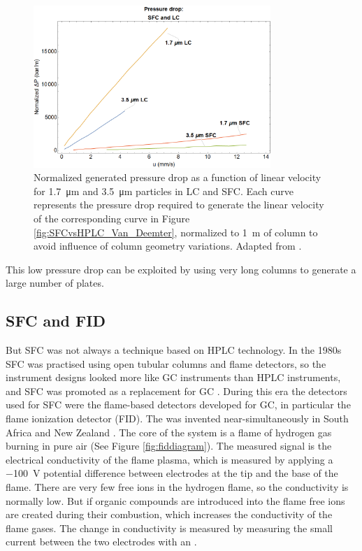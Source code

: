 \begin{figure}[hptb] \centering
\includegraphics[width=0.8\textwidth]{Figures/SFCvsHPLC_Pressure} \decoRule
\caption[]{Normalized generated pressure drop as a function of linear velocity
for \SI{1.7}{\micro\metre} and \SI{3.5}{\micro\metre} particles in LC and SFC.
Each curve represents the pressure drop  required to generate the linear
velocity of the corresponding curve in Figure \ref{fig:SFCvsHPLC_Van_Deemter},
normalized to \SI{1}{\metre} of column to avoid influence of column geometry
variations. Adapted from \autocite{Perrenoud2012}.}
\label{fig:SFCvsHPLC_Pressure}

\end{figure}

This low pressure drop can be exploited by using very long columns to generate a
large number of plates.

\subsection{SFC and FID}
\label{sec:FID}

But SFC was not always a technique based on HPLC technology. In the 1980s SFC
was practised using open tubular columns and flame detectors, so the instrument
designs looked more like GC instruments than HPLC instruments, and SFC was
promoted as a replacement for GC \autocite{Poole2003}. During this era the
detectors used for SFC were the flame-based detectors developed for GC, in
particular the flame ionization detector (FID). The  was invented near-simultaneously in South Africa and New Zealand
\autocite{Ettre2008}. The core of the system is a flame of hydrogen gas burning
in pure air (See Figure \ref{fig:fiddiagram}). The measured signal is the
electrical conductivity of the flame plasma, which is measured by applying a
\SI{-100}{\volt} potential difference between electrodes at the tip and the base
of the flame. There are very few free ions in the hydrogen flame, so the
conductivity is normally low. But if organic compounds are introduced into the
flame free ions are created during their combustion, which increases the
conductivity of the flame gases. The change in conductivity is measured by
measuring the small current between the two electrodes with an
.

